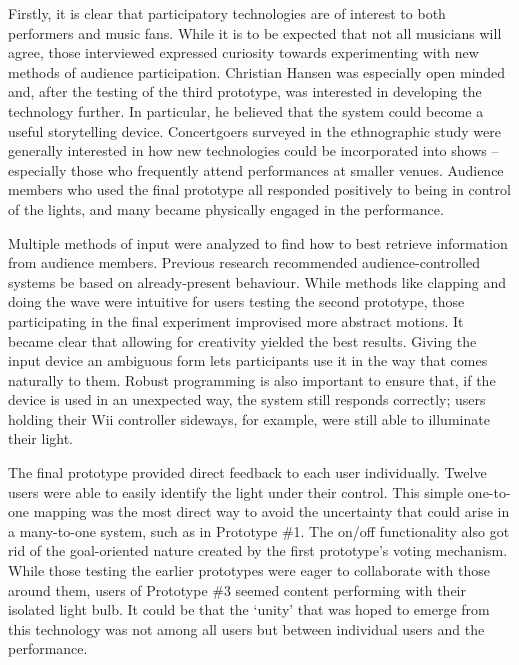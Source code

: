 
Firstly, it is clear that participatory technologies are of interest to both performers and music fans. While it is to be expected that not all musicians will agree, those interviewed expressed curiosity towards experimenting with new methods of audience participation. Christian Hansen was especially open minded and, after the testing of the third prototype, was interested in developing the technology further. In particular, he believed that the system could become a useful storytelling device. Concertgoers surveyed in the ethnographic study were generally interested in how new technologies could be incorporated into shows -- especially those who frequently attend performances at smaller venues. Audience members who used the final prototype all responded positively to being in control of the lights, and many became physically engaged in the performance.

Multiple methods of input were analyzed to find how to best retrieve information from audience members. Previous research recommended audience-controlled systems be based on already-present behaviour. While methods like clapping and doing the wave were intuitive for users testing the second prototype, those participating in the final experiment improvised more abstract motions. It became clear that allowing for creativity yielded the best results. Giving the input device an ambiguous form lets participants use it in the way that comes naturally to them. Robust programming is also important to ensure that, if the device is used in an unexpected way, the system still responds correctly; users holding their Wii controller sideways, for example, were still able to illuminate their light.

The final prototype provided direct feedback to each user individually. Twelve users were able to easily identify the light under their control. This simple one-to-one mapping was the most direct way to avoid the uncertainty that could arise in a many-to-one system, such as in Prototype \#1. The on/off functionality also got rid of the goal-oriented nature created by the first prototype's voting mechanism. While those testing the earlier prototypes were eager to collaborate with those around them, users of Prototype \#3 seemed content performing with their isolated light bulb. It could be that the `unity' that was hoped to emerge from this technology was not among all users but between individual users and the performance.

